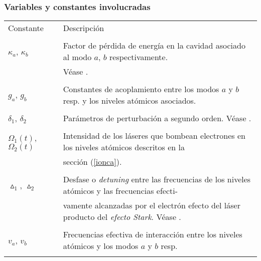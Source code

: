 \subsubsection{Variables y constantes involucradas}\label{sec:variables_involucradas}
\begin{tabular*}{\textwidth}{ll}
\hline\multirow{2}{*}{\large{Constante}}&\multirow{2}{*}{\large{Descripci\'on}}\\ &\\ \hline\\\vspace*{0.5cm}
$\kappa_a$, $\kappa_b$ & Factor de p\'erdida de energ\'ia en la cavidad asociado al modo $a$, $b$ respectivamente.\\
&V\'ease \cite{dutra}.\\\\

$g_a$, $g_b$ & Constantes de acoplamiento entre los modos $a$ y $b$ resp. y los niveles at\'omicos asociados.\\\\

$\delta_1$, $\delta_2$ & Par\'ametros de perturbaci\'on a segundo orden. V\'ease \cite{robert}.\\\\ 

$\Omega_1(t)$, $\Omega_2(t)$ & Intensidad de los l\'aseres que bombean electrones en los niveles at\'omicos descritos en la\\& secci\'on (\ref{ionca}).\\\\

$\vartriangle_1$, $\vartriangle_2$ & Desfase o \emph{detuning} entre las frecuencias de los niveles at\'omicos y las frecuencias efecti- \\&vamente alcanzadas por el electr\'on efecto del l\'aser producto del \emph{efecto Stark}. V\'ease \cite{single-photon}.\\\\

$v_a$, $v_b$ & Frecuencias efectiva de interacci\'on entre los niveles at\'omicos y los modos $a$ y $b$ resp.\\\\


\end{tabular*}

